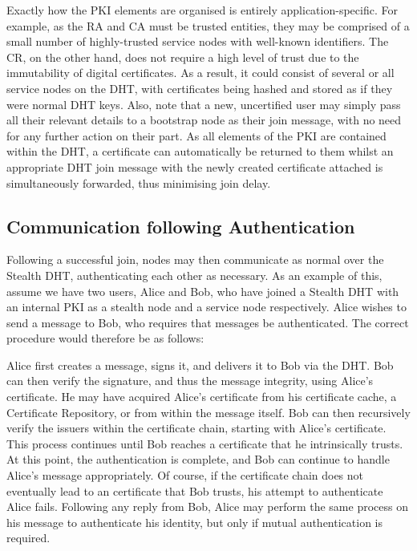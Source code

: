 \documentclass[pdftex,conference,10pt]{IEEEtran}
\begin{document}
Exactly how the PKI elements are organised is entirely
application-specific. For example, as the RA and CA must be trusted
entities, they may be comprised of a small number of highly-trusted
service nodes with well-known identifiers. The CR, on the other hand,
does not require a high level of trust due to the immutability of
digital certificates. As a result, it could consist of several or all
service nodes on the DHT, with certificates being hashed and stored as
if they were normal DHT keys. Also, note that a new, uncertified user
may simply pass all their relevant details to a bootstrap node as their
join message, with no need for any further action on their part. As all
elements of the PKI are contained within the DHT, a certificate can
automatically be returned to them whilst an appropriate DHT join
message with the newly created certificate attached is simultaneously
forwarded, thus minimising join delay.

\subsection{Communication following Authentication}
\label{subsect-communicate}

Following a successful join, nodes may then communicate as normal over
the Stealth DHT, authenticating each other as necessary. As an example
of this, assume we have two users, Alice and Bob, who have joined a
Stealth DHT with an internal PKI as a stealth node and a service node
respectively. Alice wishes to send a message to Bob, who requires that
messages be authenticated. The correct procedure would therefore be as
follows:

Alice first creates a message, signs it, and delivers it to Bob via the
DHT. Bob can then verify the signature, and thus the message integrity,
using Alice's certificate. He may have acquired Alice's certificate
from his certificate cache, a Certificate Repository, or from within
the message itself. Bob can then recursively verify the issuers within
the certificate chain, starting with Alice's certificate. This process
continues until Bob reaches a certificate that he intrinsically trusts.
At this point, the authentication is complete, and Bob can continue to
handle Alice's message appropriately. Of course, if the certificate
chain does not eventually lead to an certificate that Bob trusts, his
attempt to authenticate Alice fails. Following any reply from Bob,
Alice may perform the same process on his message to authenticate his
identity, but only if mutual authentication is required.
\end{document}
